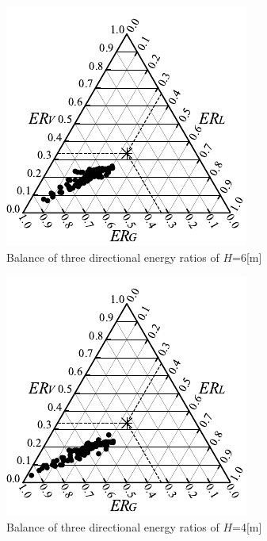 \begin{figure}[H]
    \centering
    \includegraphics[keepaspectratio,scale=1.2]{05_att/reflect/rec_Ternary_out_6m.pdf}
    \caption{\hspace{1mm}Balance of three directional energy ratios of $H$=6[m]}
    \label{fig:sankaku6_r}
\end{figure}

\begin{figure}[H]
    \centering
    \includegraphics[keepaspectratio,scale=1.2]{05_att/reflect/rec_Ternary_out_4m.pdf}
    \caption{\hspace{1mm}Balance of three directional energy ratios of $H$=4[m]}
    \label{fig:sankaku4_r}
\end{figure}

